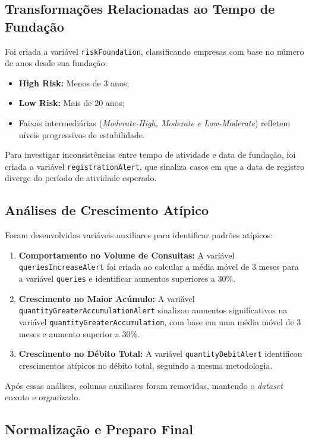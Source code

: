 \documentclass[12pt,a4paper]{article}
\begin{document}
\subsection{Transformações Relacionadas ao Tempo de Fundação}

Foi criada a variável \texttt{riskFoundation}, classificando empresas com base no número de anos desde sua fundação:
\begin{itemize}
    \item \textbf{High Risk:} Menos de 3 anos;
    \item \textbf{Low Risk:} Mais de 20 anos;
    \item Faixas intermediárias (\textit{Moderate-High, Moderate e Low-Moderate}) refletem níveis progressivos de estabilidade.
\end{itemize}

Para investigar inconsistências entre tempo de atividade e data de fundação, foi criada a variável \texttt{registrationAlert}, que sinaliza casos em que a data de registro diverge do período de atividade esperado.

\subsection{Análises de Crescimento Atípico}

Foram desenvolvidas variáveis auxiliares para identificar padrões atípicos:
\begin{enumerate}
    \item \textbf{Comportamento no Volume de Consultas:} A variável \texttt{queriesIncreaseAlert} foi criada ao calcular a média móvel de 3 meses para a variável \texttt{queries} e identificar aumentos superiores a 30\%.
    \item \textbf{Crescimento no Maior Acúmulo:} A variável \texttt{quantityGreaterAccumulationAlert} sinalizou aumentos significativos na variável \texttt{quantityGreaterAccumulation}, com base em uma média móvel de 3 meses e aumento superior a 30\%.
    \item \textbf{Crescimento no Débito Total:} A variável \texttt{quantityDebitAlert} identificou crescimentos atípicos no débito total, seguindo a mesma metodologia.
\end{enumerate}

Após essas análises, colunas auxiliares foram removidas, mantendo o \textit{dataset} enxuto e organizado.

\subsection{Normalização e Preparo Final}
\end{document}

